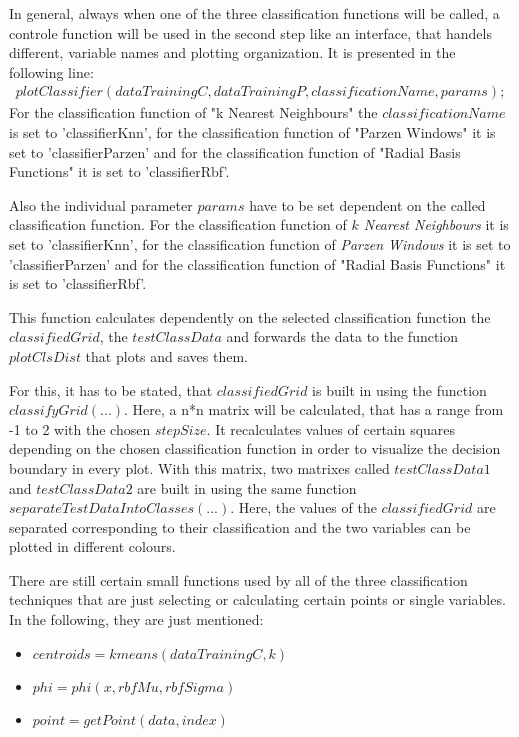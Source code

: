 \documentclass[a4paper,headings=small]{scrartcl}
\begin{document}
In general, always when one of the three classification functions will be called,
a controle function will be used in the second step like an interface, that handels different,
variable names and plotting organization. It is presented in the following line:
\begin{align}
plotClassifier(dataTrainingC, dataTrainingP, classificationName, params);
\end{align}
For the classification function of "k Nearest Neighbours" the $classificationName$ is set to 'classifierKnn',
for the classification function of "Parzen Windows" it is set to 'classifierParzen'
and for the classification function of "Radial Basis Functions" it is set to 'classifierRbf'.

Also the individual parameter $params$ have to be set dependent on the called classification function.
For the classification function of \emph{$k$ Nearest Neighbours} it is set to 'classifierKnn',
for the classification function of \emph{Parzen Windows} it is set to 'classifierParzen'
and for the classification function of "Radial Basis Functions" it is set to 'classifierRbf'.

This function calculates dependently on the selected classification function the $classified Grid$,
the $testClassData$ and forwards the data to the function $plotClsDist$ that plots and saves them.

For this, it has to be stated, that $classifiedGrid$ is built in using the function $classifyGrid(...)$.
Here, a n*n matrix will be calculated, that has a range from -1 to 2 with the chosen $stepSize$.
It recalculates values of certain squares depending on the chosen classification function
in order to visualize the decision boundary in every plot.
With this matrix, two matrixes called $testClassData1$ and $testClassData2$ are built in using
the same function $separateTestDataIntoClasses(...)$.
Here, the values of the $classifiedGrid$ are separated corresponding to their classification
and the two variables can be plotted in different colours.

There are still certain small functions used by all of the three classification techniques
that are just selecting or calculating certain points or single variables.
In the following, they are just mentioned:

\begin{itemize}
	\item $centroids = kmeans(dataTrainingC, k)$
	\item $phi = phi(x, rbfMu, rbfSigma)$
	\item $point = getPoint(data, index)$
\end{itemize}
\end{document}
